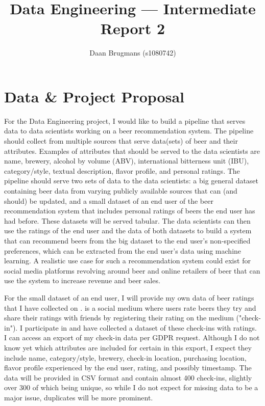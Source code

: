\documentclass[sigconf, natbib=true]{acmart}
\begin{document}
\title{Data Engineering --- Intermediate Report 2}

\author{Daan Brugmans (s1080742)}

\maketitle

\section{Data \& Project Proposal}
For the Data Engineering project, I would like to build a pipeline that serves data to data scientists working on a beer recommendation system.
The pipeline should collect from multiple sources that serve data(sets) of beer and their attributes.
Examples of attributes that should be served to the data scientists are name, brewery, alcohol by volume (ABV), international bitterness unit (IBU), category/style, textual description, flavor profile, and personal ratings.
The pipeline should serve two sets of data to the data scientists: a big general dataset containing beer data from varying publicly available sources that can (and should) be updated, and a small dataset of an end user of the beer recommendation system that includes personal ratings of beers the end user has had before.
These datasets will be served tabular.
The data scientists can then use the ratings of the end user and the data of both datasets to build a system that can recommend beers from the big dataset to the end user's non-specified preferences, which can be extracted from the end user's data using machine learning.
A realistic use case for such a recommendation system could exist for social media platforms revolving around beer and online retailers of beer that can use the system to increase revenue and beer sales.

For the small dataset of an end user, I will provide my own data of beer ratings that I have collected on \citeauthor{untappd}.
\citet{untappd} is a social medium where users rate beers they try and share their ratings with friends by registering their rating on the medium ("check-in").
I participate in \citeauthor{untappd} and have collected a dataset of these check-ins with ratings.
I can access an export of my check-in data per GDPR request.
Although I do not know yet which attributes are included for certain in this export, I expect they include name, category/style, brewery, check-in location, purchasing location, flavor profile experienced by the end user, rating, and possibly timestamp.
The data will be provided in CSV format and contain almost 400 check-ins, slightly over 300 of which being unique, so while I do not expect for missing data to be a major issue, duplicates will be more prominent.
\end{document}
